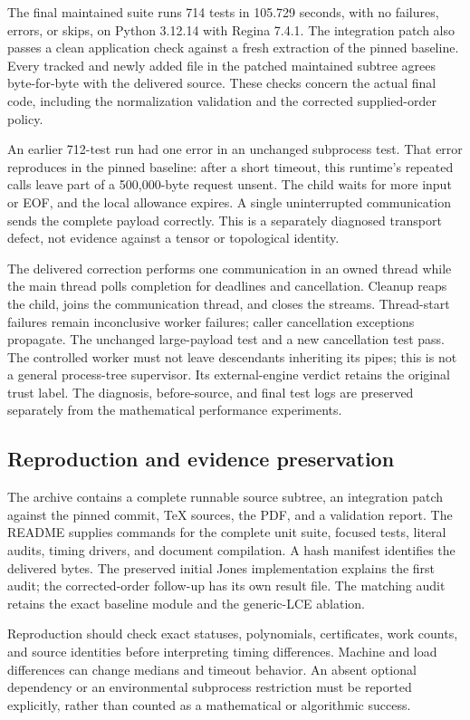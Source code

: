 The final maintained suite runs 714 tests in 105.729 seconds, with no
failures, errors, or skips, on Python 3.12.14 with Regina 7.4.1. The
integration patch also passes a clean application check against a fresh
extraction of the pinned baseline. Every tracked and newly added file in
the patched maintained subtree agrees byte-for-byte with the delivered
source. These checks concern the actual final code, including the
normalization validation and the corrected supplied-order policy.

An earlier 712-test run had one error in an unchanged subprocess test.
That error reproduces in the pinned baseline: after a short timeout, this
runtime's repeated  calls leave part of a
500,000-byte request unsent. The child waits for more input or EOF, and
the local allowance expires. A single uninterrupted communication sends
the complete payload correctly. This is a separately diagnosed transport
defect, not evidence against a tensor or topological identity.

The delivered correction performs one communication in an owned thread
while the main thread polls completion for deadlines and cancellation.
Cleanup reaps the child, joins the communication thread, and closes the
streams. Thread-start failures remain inconclusive worker failures;
caller cancellation exceptions propagate. The unchanged large-payload
test and a new cancellation test pass. The controlled worker must not
leave descendants inheriting its pipes; this is not a general process-tree
supervisor. Its external-engine verdict retains the original trust label.
The diagnosis, before-source, and final test logs are preserved separately
from the mathematical performance experiments.

\subsection{Reproduction and evidence preservation}

The archive contains a complete runnable source subtree, an integration
patch against the pinned commit, TeX sources, the PDF, and a validation
report. The README supplies commands for the complete unit suite, focused
tests, literal audits, timing drivers, and document compilation. A hash
manifest identifies the delivered bytes. The preserved initial Jones
implementation explains the first audit; the corrected-order follow-up
has its own result file. The matching audit retains the exact baseline
module and the generic-LCE ablation.

Reproduction should check exact statuses, polynomials, certificates, work
counts, and source identities before interpreting timing differences.
Machine and load differences can change medians and timeout behavior.
An absent optional dependency or an environmental subprocess restriction
must be reported explicitly, rather than counted as a mathematical or
algorithmic success.
